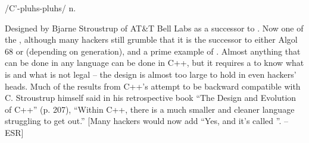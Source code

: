  /C'-pluhs-pluhs/ n.

Designed by Bjarne Stroustrup of AT\&T Bell Labs as a successor to
. Now one of the , although many
hackers still grumble that it is the successor to either Algol 68 or
 (depending on generation), and a prime example of
. Almost anything that can be done in any
language can be done in C++, but it requires a  to
know what is and what is not legal -- the design is almost too large to hold in even hackers'
heads. Much of the  results from C++'s attempt to be backward
compatible with C. Stroustrup himself said in his retrospective book ``The
Design and Evolution of C++'' (p. 207), ``Within C++, there is a much smaller
and cleaner language struggling to get out.'' [Many hackers would now add ``Yes,
and it's called ''. -- ESR]

